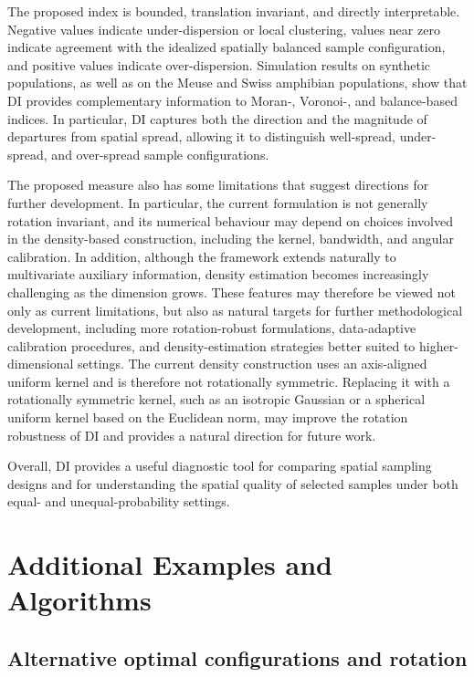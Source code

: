 \documentclass[12pt]{imsart}
\theoremstyle{plain}
\theoremstyle{remark}
\begin{document}
The proposed index is bounded, translation invariant, and directly
interpretable. Negative values indicate under-dispersion or local clustering,
values near zero indicate agreement with the idealized spatially balanced sample configuration, and
positive values indicate over-dispersion. Simulation results on synthetic populations, as well as on the Meuse and Swiss
amphibian populations, show that DI provides complementary information to Moran-, Voronoi-, and
balance-based indices. In particular, DI captures both the direction and the
magnitude of departures from spatial spread, allowing it to distinguish
well-spread, under-spread, and over-spread sample configurations.

The proposed measure also has some limitations that suggest directions for further development. In particular, the current formulation is not generally rotation invariant, and its numerical behaviour may depend on choices involved in the density-based construction, including the kernel, bandwidth, and angular calibration. In addition, although the framework extends naturally to multivariate auxiliary information, density estimation becomes increasingly challenging as the dimension grows. These features may therefore be viewed not only as current limitations, but also as natural targets for further methodological development, including more rotation-robust formulations, data-adaptive calibration procedures, and density-estimation strategies better suited to higher-dimensional settings.
The current density construction uses an axis-aligned uniform kernel and is therefore not rotationally symmetric. Replacing it with a rotationally symmetric kernel, such as an isotropic Gaussian or a spherical uniform kernel based on the Euclidean norm, may improve the rotation robustness of DI and provides a natural direction for future work.

Overall, DI provides a useful diagnostic tool for comparing spatial sampling
designs and for understanding the spatial quality of selected samples under
both equal- and unequal-probability settings.

\clearpage
\appendix
\section{Additional Examples and Algorithms}

\subsection{Alternative optimal configurations and rotation}
\label{Exm:rotation_4x5}
\end{document}
